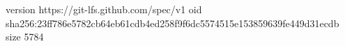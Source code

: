 version https://git-lfs.github.com/spec/v1
oid sha256:23ff786e5782cb64eb61cdb4ed258f9f6dc5574515e153859639fe449d31ecdb
size 5784
